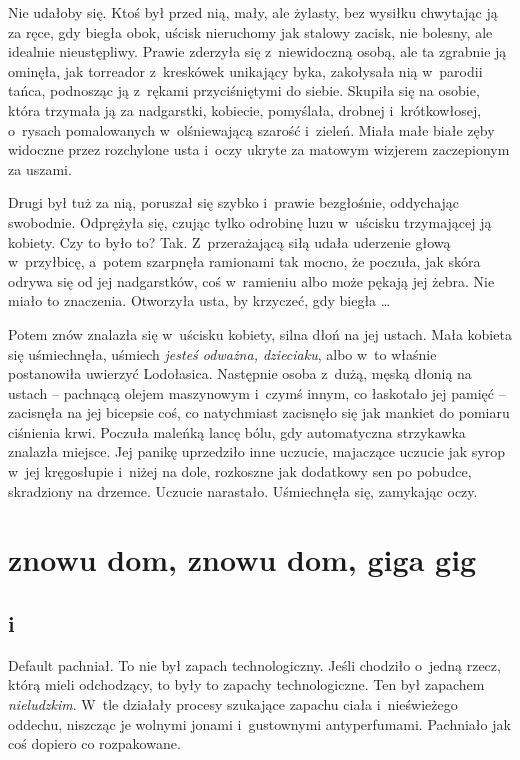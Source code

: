 \documentclass[oneside,polish,11pt,sfheadings]{mwbk}
\begin{document}
Nie udałoby się. Ktoś był przed nią, mały, ale żylasty, bez wysiłku
chwytając ją za ręce, gdy biegła obok, uścisk nieruchomy jak stalowy
zacisk, nie bolesny, ale idealnie nieustępliwy. Prawie zderzyła się z~niewidoczną osobą, ale ta zgrabnie ją ominęła, jak torreador z~kreskówek
unikający byka, zakołysała nią w~parodii tańca, podnosząc ją z~rękami
przyciśniętymi do siebie. Skupiła się na osobie, która trzymała ją za
nadgarstki, kobiecie, pomyślała, drobnej i~krótkowłosej, o~rysach
pomalowanych w~olśniewającą szarość i~zieleń. Miała małe białe zęby
widoczne przez rozchylone usta i~oczy ukryte za matowym wizjerem
zaczepionym za uszami.

Drugi był tuż za nią, poruszał się szybko i~prawie bezgłośnie,
oddychając swobodnie. Odprężyła się, czując tylko odrobinę luzu w~uścisku trzymającej ją kobiety. Czy to było to? Tak. Z~przerażającą siłą
udała uderzenie głową w~przyłbicę, a~potem szarpnęła ramionami tak
mocno, że poczuła, jak skóra odrywa się od jej nadgarstków, coś w~ramieniu albo może pękają jej żebra. Nie miało to znaczenia. Otworzyła
usta, by krzyczeć, gdy biegła \ldots 

Potem znów znalazła się w~uścisku kobiety, silna dłoń na jej ustach.
Mała kobieta się uśmiechnęła, uśmiech \textit{jesteś odważna, dzieciaku},
albo w~to właśnie postanowiła uwierzyć Lodołasica. Następnie osoba z~dużą, męską dłonią na ustach -- pachnącą olejem maszynowym i~czymś innym,
co łaskotało jej pamięć -- zacisnęła na jej bicepsie coś, co natychmiast
zacisnęło się jak mankiet do pomiaru ciśnienia krwi. Poczuła maleńką
lancę bólu, gdy automatyczna strzykawka znalazła miejsce. Jej panikę
uprzedziło inne uczucie, majaczące uczucie jak syrop w~jej kręgosłupie i~niżej na dole, rozkoszne jak dodatkowy sen po pobudce, skradziony na
drzemce. Uczucie narastało. Uśmiechnęła się, zamykając oczy.

\part{znowu dom, znowu dom, giga gig}

\chapter*{i}

Default pachniał. To nie był zapach technologiczny. Jeśli chodziło o~jedną rzecz, którą mieli odchodzący, to były to zapachy technologiczne.
Ten był zapachem \textit{nieludzkim}. W~tle działały procesy szukające
zapachu ciała i~nieświeżego oddechu, niszcząc je wolnymi jonami i~gustownymi antyperfumami. Pachniało jak coś dopiero co rozpakowane.
\end{document}
